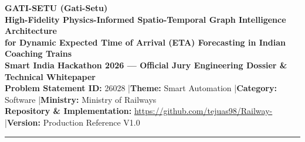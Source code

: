 \documentclass[10pt, a4paper]{article}
\begin{document}
\begin{center}
  {\Huge \textbf{\color{irnavy}GATI-SETU (Gati-Setu)}}\\[6pt]
  {\large \textbf{High-Fidelity Physics-Informed Spatio-Temporal Graph Intelligence Architecture\\for Dynamic Expected Time of Arrival (ETA) Forecasting in Indian Coaching Trains}}\\[6pt]
  {\small \textbf{Smart India Hackathon 2026 --- Official Jury Engineering Dossier \& Technical Whitepaper}}\\[4pt]
  {\footnotesize \textbf{Problem Statement ID:} 26028 \quad|\quad \textbf{Theme:} Smart Automation \quad|\quad \textbf{Category:} Software \quad|\quad \textbf{Ministry:} Ministry of Railways}\\[2pt]
  {\footnotesize \textbf{Repository \& Implementation:} \url{https://github.com/tejuas98/Railway-} \quad|\quad \textbf{Version:} Production Reference V1.0}
\end{center}

\vspace{-2mm}
\noindent\rule{\textwidth}{1.2pt}
\vspace{2mm}
\end{document}
